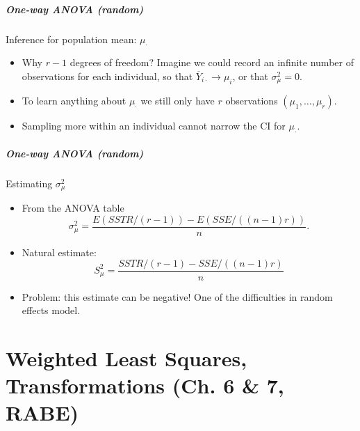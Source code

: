 \documentclass[handout]{beamer}
\begin{document}

   \begin{frame} \frametitle{One-way ANOVA (random)}

   \begin{block}
   {Inference for population mean: $\mu_{\cdot}$}
   \begin{itemize}[<+->]

   \item Why $r-1$ degrees of freedom?
   Imagine we could record an infinite number of observations for each individual, so that $\overline{Y}_{i\cdot} \rightarrow \mu_i$, or that $\sigma^2_{\mu}=0$.

   \item To learn anything about $\mu_{\cdot}$ we still only have $r$ observations
   $(\mu_1, \dots, \mu_r)$.

   \item Sampling more within an individual cannot narrow the CI for $\mu_{\cdot}$.

   \end{itemize}
   \end{block}
   \end{frame}


   \begin{frame} \frametitle{One-way ANOVA (random)}

   \begin{block}
   {Estimating $\sigma^2_{\mu}$}
   \begin{itemize}

   \item From the ANOVA table
   $$
   \sigma^2_{\mu} = \frac{E(SSTR / (r-1)) - E(SSE / ((n-1)r))}{n}.$$

   \item Natural estimate:
   $$
   S^2_{\mu} = \frac{SSTR / (r-1) - SSE / ((n-1)r)}{n}
   $$
   \item Problem: this estimate can be negative! One of the difficulties
   in random effects model.
   \end{itemize}

   \end{block}
   \end{frame}

   \part{Weighted Least Squares, Transformations (Ch. 6 \& 7, RABE)}
   \frame{\partpage}
\end{document}
